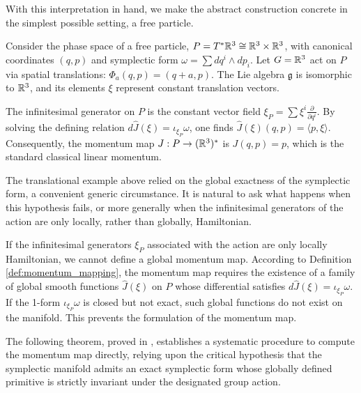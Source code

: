 \medskip
With this interpretation in hand, we make the abstract construction concrete in the simplest possible setting, a free particle.

\begin{example}
	Consider the phase space of a free particle, $P = T^*\mathbb{R}^3 \cong \mathbb{R}^3 \times \mathbb{R}^3$, with canonical coordinates $(q, p)$ and symplectic form $\omega = \sum dq^i \wedge dp_i$. Let $G = \mathbb{R}^3$ act on $P$ via spatial translations: $\Phi_a(q, p) = (q + a, p)$. The Lie algebra $\mathfrak{g}$ is isomorphic to $\mathbb{R}^3$, and its elements $\xi$ represent constant translation vectors. 
	
	The infinitesimal generator on $P$ is the constant vector field $\xi_P = \sum \xi^i \frac{\partial}{\partial q^i}$. By solving the defining relation $d\hat{J}(\xi) = \iota_{\xi_P}\omega$, one finds $\hat{J}(\xi)(q, p) = \langle p , \xi \rangle$. Consequently, the momentum map $J: P \to (\mathbb{R}^3)^*$ is $J(q, p) = p$, which is the standard classical linear momentum.
\end{example}
\medskip

The translational example above relied on the global exactness of the symplectic form, a convenient generic circumstance. It is natural to ask what happens when this hypothesis fails, or more generally when the infinitesimal generators of the action are only locally, rather than globally, Hamiltonian.

\begin{remark}
	If the infinitesimal generators $\xi_P$ associated with the action are only locally Hamiltonian, we cannot define a global momentum map. According to Definition \ref{def:momentum_mapping}, the momentum map requires the existence of a family of global smooth functions $\hat{J}(\xi)$ on $P$ whose differential satisfies $d\hat{J}(\xi) = \iota_{\xi_P}\omega$. If the 1-form $\iota_{\xi_P}\omega$ is closed but not exact, such global functions do not exist on the manifold. This prevents the formulation of the momentum map.
\end{remark}

 The following theorem, proved in \cite[Theorem 4.2.10]{abrahamFoundationsMechanics2008}, establishes a systematic procedure to compute the momentum map directly, relying upon the critical hypothesis that the symplectic manifold admits an exact symplectic form whose globally defined primitive is strictly invariant under the designated group action.

